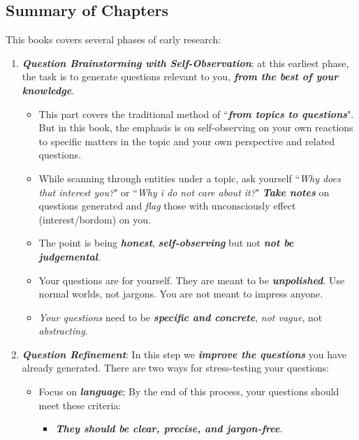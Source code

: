 \documentclass[11pt]{article}
\begin{document}
\subsection{Summary of Chapters}
This books covers several phases of early research:
\begin{enumerate}
\item \emph{\textbf{Question Brainstorming with Self-Observation}}: at this earliest phase, the task is to generate questions relevant to you, \emph{\textbf{from the best of your knowledge}}. 

\begin{itemize}
\item This part covers the traditional method of ``\emph{\textbf{from topics to questions}}". But in this book, the emphasis is on self-observing on your own reactions to specific matters in the topic and your own perspective and related questions. 

\item While scanning through entities under a topic, ask yourself  ``\emph{Why does that interest you?}" or ``\emph{Why i do not care about it?}" \emph{\textbf{Take notes}} on questions generated and \emph{flag} those with unconsciously effect (interest/bordom) on you. 

\item The point is being \emph{\textbf{honest}}, \emph{\textbf{self-observing}} but not \emph{\textbf{not be judgemental}}. 


\item Your questions are for yourself. They are meant to be \emph{\textbf{unpolished}}. Use normal worlds, not jargons. You are not meant to impress anyone. 

\item \emph{Your questions} need to be \emph{\textbf{specific and concrete}}, \emph{not vague}, not \emph{abstracting}. 
\end{itemize}

\item  \emph{\textbf{Question Refinement}}: In this step we \emph{\textbf{improve the questions}} you have already generated. 
There are two ways for stress-testing your questions:
\begin{itemize}
\item Focus on \emph{\textbf{language}}; By the end of this process, your questions should meet these criteria:
\begin{itemize}
\item \textbf{\emph{They should be clear, precise, and jargon-free}}. 


\end{itemize}
\end{itemize}
\end{enumerate}
\end{document}

